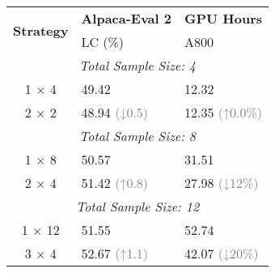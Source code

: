 \begin{table}[!tp]
\small
\centering
\setlength{\tabcolsep}{1.4em}
\renewcommand{\arraystretch}{1.2}
\begin{tabular}{c ll}
\hline
\multirow{2}{*}{\bf Strategy} & \textbf{Alpaca-Eval 2} & {\textbf{GPU Hours}} \\ \cline{2-3} 
& LC (\%) & A800 \\ \hline
\multicolumn{3}{c}{\textit{Total Sample Size: 4}} \\
1 $\times$ 4   & 49.42 & 12.32  \\ 
2 $\times$ 2   & 48.94 \textcolor{gray}{\scriptsize{(↓0.5)}} & 12.35 \textcolor{gray}{\scriptsize{(↑0.0\%)}}  \\ 
\hline
\multicolumn{3}{c}{\textit{Total Sample Size: 8}} \\
1 $\times$ 8   & 50.57 & 31.51  \\
2 $\times$ 4   & 51.42 \textcolor{gray}{\scriptsize{(↑0.8)}} & 27.98 \textcolor{gray}{\scriptsize{(↓12\%)}}  \\
\hline

\multicolumn{3}{c}{\textit{Total Sample Size: 12}} \\
1 $\times$ 12 & 51.55 & 52.74  \\ 
3 $\times$ 4 & 52.67 \textcolor{gray}{\scriptsize{(↑1.1)}} & 42.07 \textcolor{gray}{\scriptsize{(↓20\%)}}  \\
\hline
\end{tabular}
\vspace{-2mm}
\caption{}
\vspace{-5mm}
\label{tab:iter}
\end{table}
